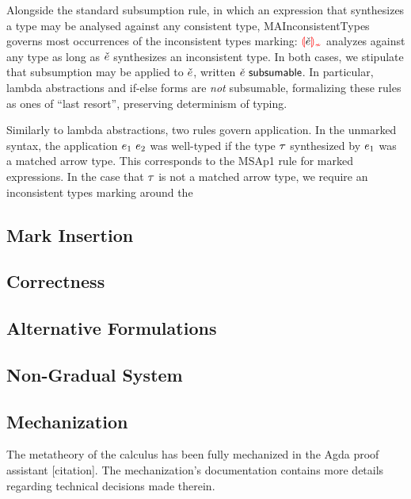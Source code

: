 Alongside the standard subsumption rule, in which an expression that synthesizes a type may be
analysed against any consistent type, MAInconsistentTypes governs most occurrences of the
inconsistent types marking: $\ECInconType{\ECMV}$ analyzes against any type as long as $\check{e}$
synthesizes an inconsistent type. In both cases, we stipulate that subsumption may be applied to
$\check{e}$, written $\check{e} ~{\normalfont{\normalfont\textsf{subsumable}}}$. In particular, lambda abstractions and if-else forms are
\emph{not} subsumable, formalizing these rules as ones of ``last resort'', preserving determinism of
typing.

Similarly to lambda abstractions, two rules govern application. In the unmarked syntax, the
application $e_1 ~e_2$ was well-typed if the type $\tau$ synthesized by $e_1$ was a
matched arrow type. This corresponds to the MSAp1 rule for marked expressions. In the case that
$\tau$ is not a matched arrow type, we require an inconsistent types marking around the

\subsection{Mark Insertion}

\subsection{Correctness}
\label{sec:calculus-correctness}



\subsection{Alternative Formulations}

\subsection{Non-Gradual System}
\label{sec:calculus-non-gradual}


\subsection{Mechanization}
\label{sec:calculus-agda}

The metatheory of the calculus has been fully mechanized in the Agda proof assistant [citation]. The
mechanization's documentation contains more details regarding technical decisions made therein.
